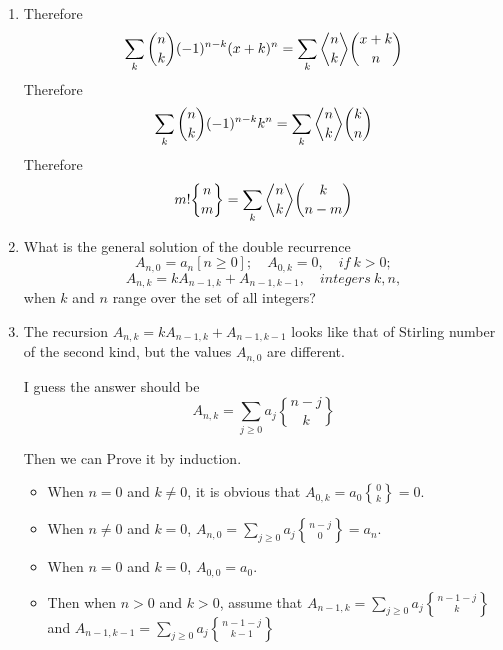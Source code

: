 \documentclass[12pt,a4paper]{article}
\makeatletter
\newtheorem*{solution}{Solution}
\theoremstyle{definition}
\def\bangle{ \atopwithdelims \langle \rangle}
\renewenvironment{solution}[1][Solution] {\par\pushQED{\qed}\normalfont\topsep6\p@\@plus6\p@\relax\trivlist\item[\hskip\labelsep\bfseries#1\@addpunct{.}]\ignorespaces}{\popQED\endtrivlist\@endpefalse} \makeatother
\makeatother
\begin{document}
\begin{enumerate}
\begin{solution}
        	Therefore 
        	\begin{equation*}
        	    \sum_k \binom{n}{k} (-1)^{n-k} (x+k)^n=\sum_{k} {n \bangle k}\binom{x+k}{n}
        	\end{equation*}
        	Therefore
        	\begin{equation*}
        	    \sum_k \binom{n}{k} (-1)^{n-k} k^n=\sum_{k} {n \bangle k}\binom{k}{n}
        	\end{equation*}
        	Therefore
        	\begin{equation*}
        	    m!{n \brace m}=\sum_k {n \bangle k}\binom{k}{n-m}
        	\end{equation*}
        \end{solution}
    \item 
        What is the general solution of the double recurrence
        \begin{equation*}
            A_{n,0}=a_n[n \ge 0];\quad A_{0,k}=0,\quad if\ k>0;
        \end{equation*}
        \begin{equation*}
            A_{n,k}=kA_{n-1,k}+A_{n-1,k-1},\quad integers\ k,n,
        \end{equation*}
        when $k$ and $n$ range over the set of all integers?
        \begin{solution}
        	The recursion $A_{n,k}=kA_{n-1,k}+A_{n-1,k-1}$ looks like that of Stirling number of the second kind, but the values $A_{n,0}$ are different.
        	
        	I guess the answer should be
        	\begin{equation*}
        	    A_{n,k}=\sum_{j\ge 0} a_j {n-j \brace k}
        	\end{equation*}
        	
        	Then we can Prove it by induction.
        	
        	\begin{itemize}
        		\item
        		    When $n=0$ and $k\neq 0$, it is obvious that $A_{0,k}=a_0{0 \brace k}=0$.
        		\item 
        		    When $n\neq 0$ and $k=0$, $A_{n,0}=\sum_{j \ge 0}a_j{n-j \brace 0}=a_n$.
        		\item 
        		    When $n=0$ and $k=0$, $A_{0,0}=a_0$.
        		\item 
        		    Then when $n>0$ and $k>0$, assume that $A_{n-1,k}=\sum_{j\ge 0} a_j {n-1-j \brace k}$ and $A_{n-1,k-1} =\sum_{j\ge 0} a_j {n-1-j \brace k-1}$
        		    

\end{itemize}
\end{solution}
\end{enumerate}
\end{document}
